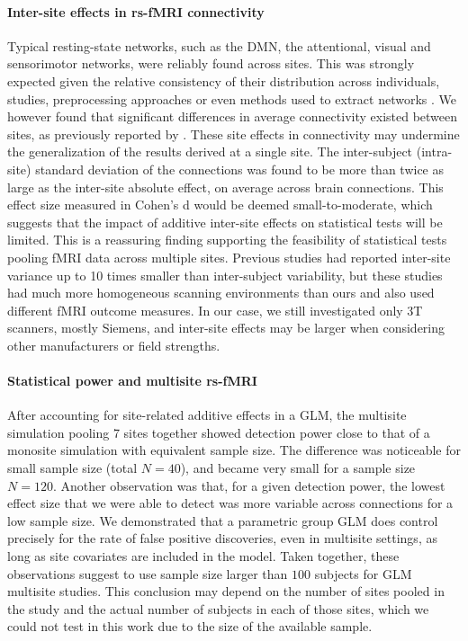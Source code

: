 \documentclass[authoryear]{elsarticle}
\begin{document}
\paragraph{Inter-site effects in rs-fMRI connectivity} Typical resting-state networks, such as the DMN, the attentional, visual and sensorimotor networks, were reliably found across sites. This was strongly expected given the relative consistency of their distribution across individuals, studies, preprocessing approaches or even methods used to extract networks \citep[e.g.][]{Damoiseaux2006,Heuvel2008,Bellec2010c,Yeo2011,Power2011}. We however found that significant differences
in average connectivity existed between sites, as previously
reported by \cite{Yan2013a}. These site effects in connectivity may undermine the
generalization of the results derived at a single site. The inter-subject
(intra-site) standard deviation of the connections was found to be more than
twice as large as the inter-site absolute effect, on average across brain connections. This effect size measured in Cohen's d would be deemed small-to-moderate, which suggests that the impact of additive inter-site effects on statistical tests will be limited. This is a reassuring finding supporting the feasibility of statistical tests pooling fMRI data across multiple sites. Previous studies \citep{Sutton2008,Brown2011} had reported inter-site variance up to 10 times smaller than inter-subject variability, but these studies had much more homogeneous scanning environments than ours and also used different fMRI outcome measures. In our case, we still investigated only 3T scanners, mostly Siemens, and inter-site effects may be larger when considering other manufacturers or field strengths.\\

\paragraph{Statistical power and multisite rs-fMRI} After accounting for site-related additive effects in a GLM, the multisite simulation pooling 7 sites together showed detection power close to that of a monosite simulation with equivalent sample size. The difference was noticeable for small sample size (total $N=40$), and became very small for a sample size $N=120$. Another observation was that, for a given detection power, the lowest effect size that we were able to detect was more variable across connections for a low sample size. We demonstrated that a parametric group GLM does control precisely for the rate of false positive discoveries, even in multisite settings, as long as site covariates are included in the model. Taken together, these observations suggest to use sample size larger than $100$ subjects for GLM multisite studies. This conclusion may depend on the number of sites pooled in the study and the actual number of subjects in each of those sites, which we could not test in this work due to the size of the available sample.
\end{document}
